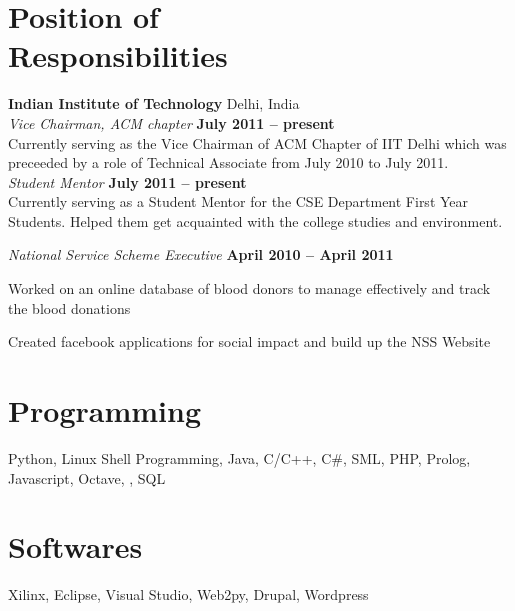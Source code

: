 \documentclass[margin,line]{resume}
\begin{document}
\begin{resume}
    \section{\mysidestyle Position of \\Responsibilities}
    \textbf{Indian Institute of Technology} Delhi, India\vspace{2mm}\\\vspace{1mm}%
    \textsl{Vice Chairman, ACM chapter} \hfill \textbf{July 2011 -- present}\\
    Currently serving as the Vice Chairman of ACM Chapter of IIT Delhi which was preceeded by a role of Technical Associate from July 2010 to July 2011.\vspace{2mm}\\\vspace{1mm}%
    \textsl{Student Mentor} \hfill \textbf{July 2011 -- present}\\
    Currently serving as a Student Mentor for the CSE Department First Year Students. Helped them get acquainted with the college studies and environment.

    \textsl{National Service Scheme Executive} \hfill \textbf{April 2010 -- April 2011}\vspace{1mm}\\%
    \begin{list2}
	\item Worked on an online database of blood donors to manage effectively and track the blood donations
	\item Created facebook applications for social impact and build up the NSS Website
    \end{list2}\vspace{-1.5mm}

    \section{\mysidestyle Programming} 
    Python, Linux Shell Programming, Java, C/C++, C\#, SML, PHP, Prolog, Javascript, Octave, \LaTeXe, SQL

    \section{\mysidestyle Softwares} 
    Xilinx, Eclipse, Visual Studio, Web2py, Drupal, Wordpress



\end{resume}
\end{document}
